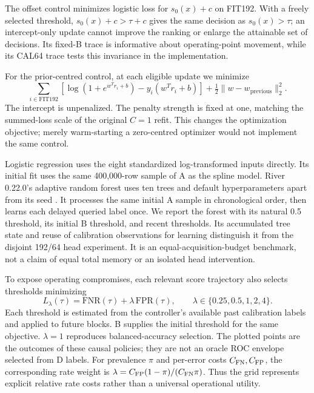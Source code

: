 The offset control minimizes logistic loss for $s_0(x)+c$ on FIT192. With a freely selected threshold, $s_0(x)+c>\tau+c$ gives the same decision as $s_0(x)>\tau$; an intercept-only update cannot improve the ranking or enlarge the attainable set of decisions. Its fixed-B trace is informative about operating-point movement, while its CAL64 trace tests this invariance in the implementation.

For the prior-centred control, at each eligible update we minimize
\begin{equation}
 \sum_{i\in\mathrm{FIT192}}\!\left[\log(1+e^{w^T r_i+b})-y_i(w^T r_i+b)\right]
 +\tfrac12\lVert w-w_{\mathrm{previous}}\rVert_2^2.
\end{equation}
The intercept is unpenalized. The penalty strength is fixed at one, matching the summed-loss scale of the original $C=1$ refit. This changes the optimization objective; merely warm-starting a zero-centred optimizer would not implement the same control.

Logistic regression uses the eight standardized log-transformed inputs directly. Its initial fit uses the same 400,000-row sample of A as the spline model. River 0.22.0's adaptive random forest uses ten trees and default hyperparameters apart from its seed \citep{gomes2017,riverdocs}. It processes the same initial A sample in chronological order, then learns each delayed queried label once. We report the forest with its natural 0.5 threshold, its initial B threshold, and recent thresholds. Its accumulated tree state and reuse of calibration observations for learning distinguish it from the disjoint 192/64 head experiment. It is an equal-acquisition-budget benchmark, not a claim of equal total memory or an isolated head intervention.

To expose operating compromises, each relevant score trajectory also selects thresholds minimizing
\begin{equation}
 L_\lambda(\tau)=\mathrm{FNR}(\tau)+\lambda\,\mathrm{FPR}(\tau),
 \qquad \lambda\in\{0.25,0.5,1,2,4\}.
 \label{eq:cost}
\end{equation}
Each threshold is estimated from the controller's available past calibration labels and applied to future blocks. B supplies the initial threshold for the same objective. $\lambda=1$ reproduces balanced-accuracy selection. The plotted points are the outcomes of these causal policies; they are not an oracle ROC envelope selected from D labels. For prevalence $\pi$ and per-error costs $C_{\rm FN},C_{\rm FP}$, the corresponding rate weight is $\lambda=C_{\rm FP}(1-\pi)/(C_{\rm FN}\pi)$. Thus the grid represents explicit relative rate costs rather than a universal operational utility.

